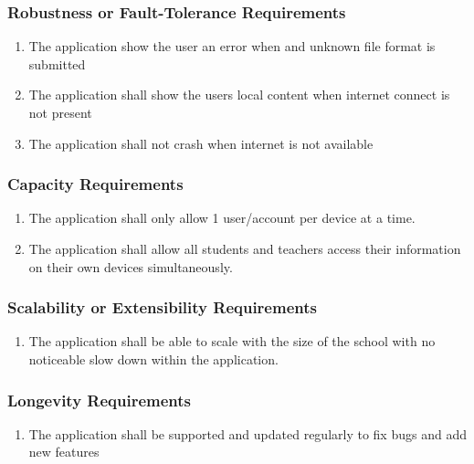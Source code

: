 \documentclass[]{article}
\begin{document}
\subsubsection{Robustness or Fault-Tolerance Requirements}
\label{ssub:robustness_or_fault_tolerance_requirements}
\begin{enumerate}[{PR}1. ]
	\item The application show the user an error when and unknown file format is submitted
	\item The application shall show the users local content when internet connect is not present
	\item The application shall not crash when internet is not available
\end{enumerate}

\subsubsection{Capacity Requirements}
\label{ssub:capacity_requirements}
\begin{enumerate}[{PR}1. ]
	\item The application shall only allow 1 user/account per device at a time.
	\item The application shall allow all students and teachers access their information on their own devices simultaneously.
\end{enumerate}

\subsubsection{Scalability or Extensibility Requirements}
\label{ssub:scalability_or_extensibility_requirements}
\begin{enumerate}[{PR}1. ]
	\item The application shall be able to scale with the size of the school with no noticeable slow down within the application.
\end{enumerate}

\subsubsection{Longevity Requirements}
\label{ssub:longevity_requirements}
\begin{enumerate}[{PR}1. ]
	\item The application shall be supported and updated regularly to fix bugs and
add new features
\end{enumerate}
\end{document}
